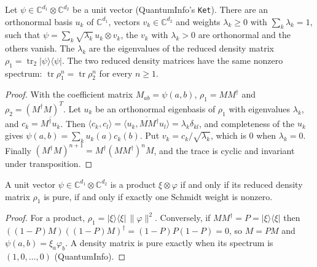 \begin{theorem}\label{thm:schmidt}
  \leanok
  Let $\psi\in\mathbb C^{d_1}\otimes\mathbb C^{d_2}$ be a unit vector (QuantumInfo's \texttt{Ket}). There are an orthonormal basis
  $u_k$ of $\mathbb C^{d_1}$, vectors $v_k\in\mathbb C^{d_2}$ and weights $\lambda_k\ge0$ with $\sum_k\lambda_k=1$, such that
  $\psi=\sum_k\sqrt{\lambda_k}\,u_k\otimes v_k$, the $v_k$ with $\lambda_k>0$ are orthonormal and the others vanish. The $\lambda_k$ are
  the eigenvalues of the reduced density matrix $\rho_1=\operatorname{tr}_2|\psi\rangle\langle\psi|$. The two reduced density
  matrices have the same nonzero spectrum: $\operatorname{tr}\rho_1^n=\operatorname{tr}\rho_2^n$ for every $n\ge1$.
\end{theorem}
\begin{proof}\leanok
  With the coefficient matrix $M_{ab}=\psi(a,b)$, $\rho_1=MM^\dagger$ and $\rho_2=(M^\dagger M)^T$. Let $u_k$ be an orthonormal
  eigenbasis of $\rho_1$ with eigenvalues $\lambda_k$, and $c_k=\overline{M^\dagger u_k}$. Then
  $\langle c_k,c_l\rangle=\overline{\langle u_k,MM^\dagger u_l\rangle}=\lambda_k\delta_{kl}$, and completeness of the $u_k$ gives
  $\psi(a,b)=\sum_ku_k(a)c_k(b)$. Put $v_k=c_k/\sqrt{\lambda_k}$, which is $0$ when $\lambda_k=0$. Finally
  $(M^\dagger M)^{n+1}=M^\dagger(MM^\dagger)^nM$, and the trace is cyclic and invariant under transposition.
\end{proof}

\begin{corollary}\label{cor:product-state}
  \leanok
  A unit vector $\psi\in\mathbb C^{d_1}\otimes\mathbb C^{d_2}$ is a product $\xi\otimes\varphi$ if and only if its reduced density
  matrix $\rho_1$ is pure, if and only if exactly one Schmidt weight is nonzero.
\end{corollary}
\begin{proof}\leanok
  For a product, $\rho_1=|\xi\rangle\langle\xi|\,\|\varphi\|^2$. Conversely, if $MM^\dagger=P=|\xi\rangle\langle\xi|$ then
  $((1-P)M)((1-P)M)^\dagger=(1-P)P(1-P)=0$, so $M=PM$ and $\psi(a,b)=\xi_a\varphi_b$. A density matrix is pure exactly when
  its spectrum is $(1,0,\dots,0)$ (QuantumInfo).
\end{proof}

